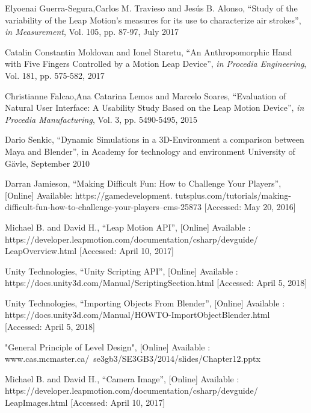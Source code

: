 \documentclass[journal]{IEEEtran}										    %
\begin{document}
        
        \begin{thebibliography}{1}

                Elyoenai Guerra-Segura,Carlos M. Travieso and Jesús B. Alonso, “Study of the 
                variability of the Leap Motion’s measures for its use to characterize air strokes”, 
                \emph{in Measurement}, Vol. 105, pp. 87-97, July 2017
                
                
                Catalin Constantin Moldovan and Ionel Staretu, “An Anthropomorphic Hand with Five 
                Fingers Controlled by a Motion Leap Device”, \emph{in Procedia Engineering}, Vol. 181, 
                pp. 575-582, 2017
                

                Christianne Falcao,Ana Catarina Lemos and Marcelo Soares, “Evaluation of Natural User 
                Interface: A Usability Study Based on the Leap Motion Device”, 
                \emph{in Procedia Manufacturing}, Vol. 3, pp. 5490-5495, 2015
            
                Dario Senkic, “Dynamic Simulations in a 3D-Environment a comparison between Maya
                and Blender”, in Academy for technology and environment University of Gävle, 
                September 2010

                Darran Jamieson, “Making Difficult Fun: How to Challenge Your Players”, [Online]
                Available: https://gamedevelopment.
                tutsplus.com/tutorials/making-difficult-fun-how-to-challenge-your-players--cms-25873 [Accessed: May 20, 2016]
            
                Michael B. and David H., “Leap Motion API”, [Online] Available :
                https://developer.leapmotion.com/documentation/csharp/devguide/ \\
                Leap\textunderscore Overview.html 
                [Accessed: April 10, 2017]

                Unity Technologies, “Unity Scripting API”, [Online] Available :
                https://docs.unity3d.com/Manual/ScriptingSection.html [Accessed: April 5, 2018]
            
                Unity Technologies, “Importing Objects From Blender”, [Online] Available : 
                https://docs.unity3d.com/Manual/HOWTO-ImportObjectBlender.html [Accessed: April 5, 2018]

                "General Principle of Level Design", [Online] Available :
                www.cas.mcmaster.ca/~se3gb3/SE3GB3/2014/slides/Chapter12.pptx
            
                Michael B. and David H., “Camera Image”, [Online] Available : 
                https://developer.leapmotion.com/documentation/csharp/devguide/ \\
                Leap\textunderscore Images.html 
                [Accessed: April 10, 2017]

        \end{thebibliography}
\end{document}
